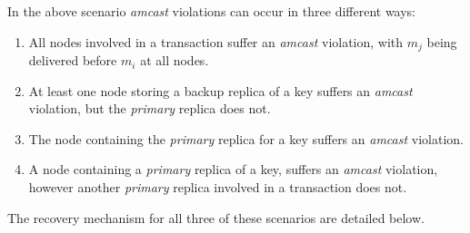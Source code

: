      In the above scenario \emph{amcast} violations can occur in three different ways:
    
    \begin{enumerate}
        \item All nodes involved in a transaction suffer an \emph{amcast} violation, with $m_j$ being delivered before $m_i$ at all nodes.      
        
        \item At least one node storing a backup replica of a key suffers an \emph{amcast} violation, but the \emph{primary} replica does not.  
        
        \item The node containing the \emph{primary} replica for a key suffers an \emph{amcast} violation.  
        
        \item A node containing a \emph{primary} replica of a key, suffers an \emph{amcast} violation, however another \emph{primary} replica involved in a transaction does not.
    \end{enumerate}
    
    The recovery mechanism for all three of these scenarios are detailed below.
    
